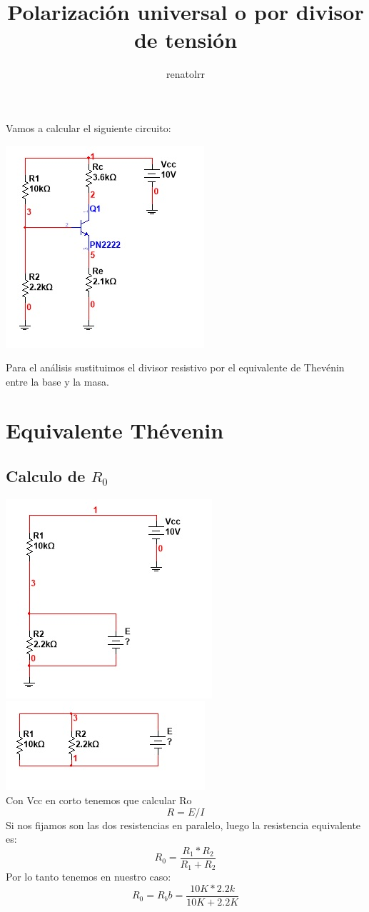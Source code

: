 \documentclass[10pt,a4paper]{article}
\author{renatolrr}
\title{Polarización universal o por divisor de tensión}
\begin{document}
\maketitle
Vamos a calcular el siguiente circuito:

\includegraphics[scale=1]{Images/Imagen1.jpg} 

Para el análisis sustituimos el divisor resistivo por el equivalente de Thevénin entre la base y la masa.

\section{Equivalente Thévenin}
\subsection{Calculo de $R_{0}$}
\includegraphics[scale=1]{Images/Imagen2.jpg}
\includegraphics[scale=1]{Images/Imagen3.jpg} 
\\
Con Vcc en corto tenemos que calcular Ro
\[R=E/I\]
Si nos fijamos son las dos resistencias en paralelo, luego la resistencia equivalente es:
\[R_{0}=\frac{R_{1}*R_{2}}{R_{1}+R_{2}}\]
Por lo tanto tenemos en nuestro caso:
\[R_{0}=R_bb=\frac{10K*2.2k}{10K+2.2K}\]
\end{document}

